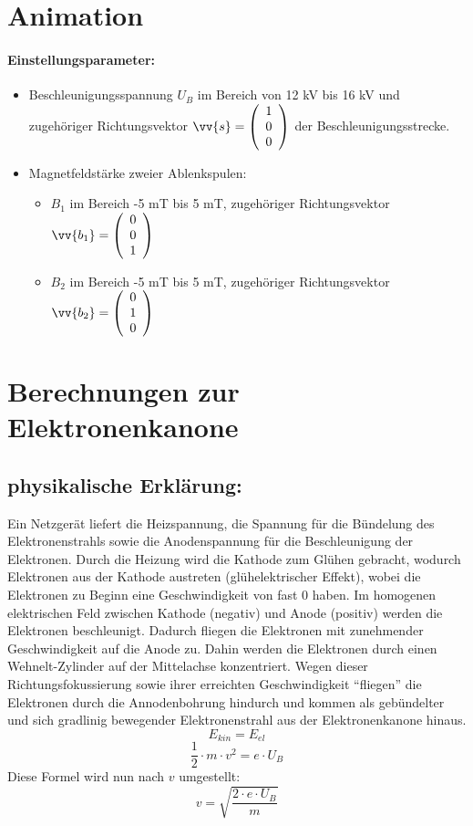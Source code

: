 \section{Animation}
\label{sec:animation}
\paragraph{Einstellungsparameter:}

\begin{itemize}
    \item Beschleunigungsspannung $U_B$ im Bereich von 12 kV bis 16 kV und  zugehöriger Richtungsvektor $\vv{s} = \vektor{1}{0}{0}$ der Beschleunigungsstrecke.
    \item Magnetfeldstärke zweier Ablenkspulen:
    
    \begin{itemize}
        \item $B_1$ im Bereich -5 mT bis 5 mT, zugehöriger Richtungsvektor $\vv{b_1} = \vektor{0}{0}{1}$ %
        \item $B_2$ im Bereich -5 mT bis 5 mT, zugehöriger Richtungsvektor $\vv{b_2} = \vektor{0}{1}{0}$ %
    \end{itemize}

\end{itemize}


\section{Berechnungen zur Elektronenkanone}

\subsection{physikalische Erklärung:}
\label{sec:tolle-section}
 
Ein Netzgerät liefert die Heizspannung, die Spannung für die Bündelung des Elektronenstrahls sowie die Anodenspannung für die Beschleunigung der Elektronen.
Durch die Heizung wird die Kathode zum Glühen gebracht, wodurch Elektronen aus der Kathode austreten (glühelektrischer Effekt), wobei die Elektronen zu Beginn eine Geschwindigkeit von fast $0$ haben.
Im homogenen elektrischen Feld zwischen Kathode (negativ) und Anode (positiv) werden die Elektronen beschleunigt.
Dadurch fliegen die Elektronen mit zunehmender Geschwindigkeit auf die Anode zu.
Dahin werden die Elektronen durch einen Wehnelt-Zylinder auf der Mittelachse konzentriert.
Wegen dieser Richtungsfokussierung sowie ihrer erreichten Geschwindigkeit "`fliegen"' die Elektronen durch die Annodenbohrung hindurch und kommen als gebündelter und sich gradlinig bewegender Elektronenstrahl aus der Elektronenkanone hinaus.
$$ E_{kin} = E_{el}$$
$$ \frac{1}{2} \cdot m \cdot v^2 = e \cdot U_B$$
Diese Formel wird  nun nach $v$ umgestellt:
\begin{equation}
\label{eq:v}
   v = \sqrt{\frac{2 \cdot e \cdot U_B}{m}} 
\end{equation}
$$ $$


